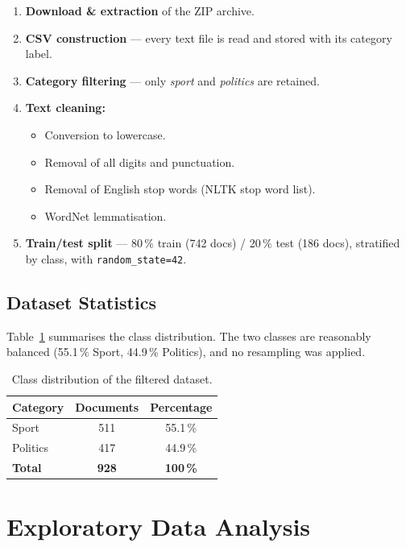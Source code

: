 \documentclass[conference, 10pt]{IEEEtran}
\begin{document}
\begin{enumerate}[noitemsep]
  \item \textbf{Download \& extraction} of the ZIP archive.
  \item \textbf{CSV construction} --- every text file is read and stored with its category label.
  \item \textbf{Category filtering} --- only \emph{sport} and \emph{politics} are retained.
  \item \textbf{Text cleaning:}
    \begin{itemize}[noitemsep]
      \item Conversion to lowercase.
      \item Removal of all digits and punctuation.
      \item Removal of English stop words (NLTK stop word list).
      \item WordNet lemmatisation.
    \end{itemize}
  \item \textbf{Train/test split} --- 80\,\% train (742 docs) / 20\,\% test (186 docs), stratified by class, with \texttt{random\_state=42}.
\end{enumerate}

\subsection{Dataset Statistics}

Table~\ref{tab:class_dist} summarises the class distribution.  The two classes are reasonably balanced (55.1\,\% Sport, 44.9\,\% Politics), and no resampling was applied.

\begin{table}[h]
\centering
\caption{Class distribution of the filtered dataset.}
\label{tab:class_dist}
\begin{tabular}{lcc}
\toprule
\textbf{Category} & \textbf{Documents} & \textbf{Percentage} \\
\midrule
Sport    & 511 & 55.1\,\% \\
Politics & 417 & 44.9\,\% \\
\midrule
\textbf{Total} & \textbf{928} & \textbf{100\,\%} \\
\bottomrule
\end{tabular}
\end{table}


\section{Exploratory Data Analysis}
\label{sec:eda}
\end{document}
